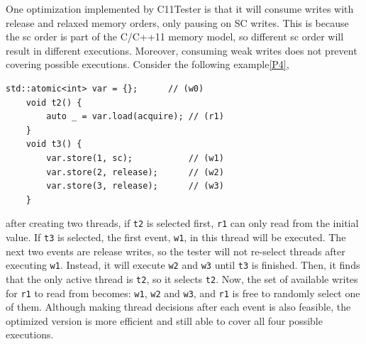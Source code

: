 One optimization implemented by C11Tester is that it will consume writes with release and relaxed memory orders, only pausing on SC writes. This is because the sc order is part of the C/C++11 memory model, so different sc order will result in different executions. Moreover, consuming weak writes does not prevent covering possible executions. Consider the following example\ref{P4},
\begin{lstlisting}[caption={P4}, label={P4}]
    std::atomic<int> var = {};      // (w0)
    void t2() {
        auto _ = var.load(acquire); // (r1)
    }
    void t3() {
        var.store(1, sc);           // (w1)
        var.store(2, release);      // (w2)
        var.store(3, release);      // (w3)
    }
\end{lstlisting}
after creating two threads, if \texttt{t2} is selected first, \texttt{r1} can only read from the initial value. If \texttt{t3} is selected, the first event, \texttt{w1}, in this thread will be executed. The next two events are release writes, so the tester will not re-select threads after executing \texttt{w1}. Instead, it will execute \texttt{w2} and \texttt{w3} until \texttt{t3} is finished. Then, it finds that the only active thread is \texttt{t2}, so it selects \texttt{t2}. Now, the set of available writes for \texttt{r1} to read from becomes: \texttt{w1}, \texttt{w2} and \texttt{w3}, and \texttt{r1} is free to randomly select one of them. Although making thread decisions after each event is also feasible, the optimized version is more efficient and still able to cover all four possible executions.

